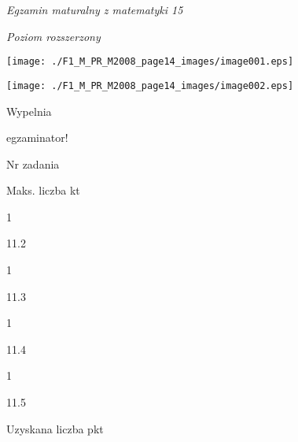 \documentclass[a4paper,12pt]{article}
\begin{document}
{\it Egzamin maturalny z matematyki 15}

{\it Poziom rozszerzony}
\begin{center}
\texttt{[image: ./F1\_M\_PR\_M2008\_page14\_images/image001.eps]}

\texttt{[image: ./F1\_M\_PR\_M2008\_page14\_images/image002.eps]}
\end{center}
Wypelnia

egzaminator!

Nr zadania

Maks. liczba kt

1

11.2

1

11.3

1

11.4

1

11.5

Uzyskana liczba pkt
\end{document}
